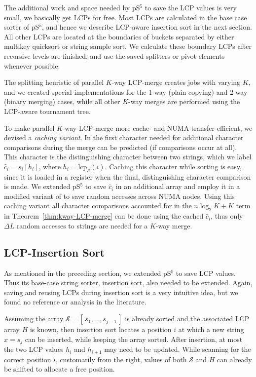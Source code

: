 \documentclass[a4paper]{myjournal}
\newcommand{\lcp}{\mathrm{lcp}}
\newcommand{\Strings}{\mathcal{S}}
\newcommand{\arr}[1]{[\, #1 \,]}
\begin{document}
The additional work and space needed by pS$^5$ to save the LCP values is very
small, we basically get LCPs for free. Most LCPs are calculated in the base case
sorter of pS$^5$, and hence we describe LCP-aware insertion sort in the next
section. All other LCPs are located at the boundaries of buckets separated by
either multikey quicksort or string sample sort. We calculate these boundary
LCPs after recursive levels are finished, and use the saved splitters or pivot
elements whenever possible.

The splitting heuristic of parallel $K$-way LCP-merge creates jobs with varying
$K$, and we created special implementations for the 1-way (plain copying) and
2-way (binary merging) cases, while all other $K$-way merges are performed using
the LCP-aware tournament tree.

To make parallel $K$-way LCP-merge more cache- and NUMA transfer-efficient, we
devised a \emph{caching variant}. In \LCPCompare the first character needed for
additional character comparisons during the merge can be predicted (if
comparisons occur at all).  This character is the distinguishing character
between two strings, which we label $\hat{c}_i = s_i[h_i]$, where $h_i =
\lcp_{\Strings}(i)$. Caching this character while sorting is easy, since it is
loaded in a register when the final, distinguishing character comparison is
made. We extended pS$^5$ to save $\hat{c}_i$ in an additional array and employ
it in a modified variant of \LCPCompare to save random accesses across NUMA
nodes.  Using this caching variant all character comparisons accounted for in
the $n \log_2 K + K$ term in Theorem~\ref{thm:kway-LCP-merge} can be done using
the cached $\hat{c}_i$, thus only $\Delta L$ random accesses to strings are
needed for a $K$-way merge.

\subsection{LCP-Insertion Sort}\label{sec:lcp-inssort}

As mentioned in the preceding section, we extended pS$^5$ to save LCP
values. Thus its base-case string sorter, insertion sort, also needed to be
extended. Again, saving and reusing LCPs during insertion sort is a very
intuitive idea, but we found no reference or analysis in the literature.

Assuming the array $\Strings = \arr{ s_1,\ldots,s_{j-1} }$ is already sorted and
the associated LCP array $H$ is known, then insertion sort locates a position
$i$ at which a new string $x = s_j$ can be inserted, while keeping the array
sorted. After insertion, at most the two LCP values $h_i$ and $h_{i+1}$ may need
to be updated. While scanning for the correct position $i$, customarily from the
right, values of both $\Strings$ and $H$ can already be shifted to allocate a
free position.
\end{document}
